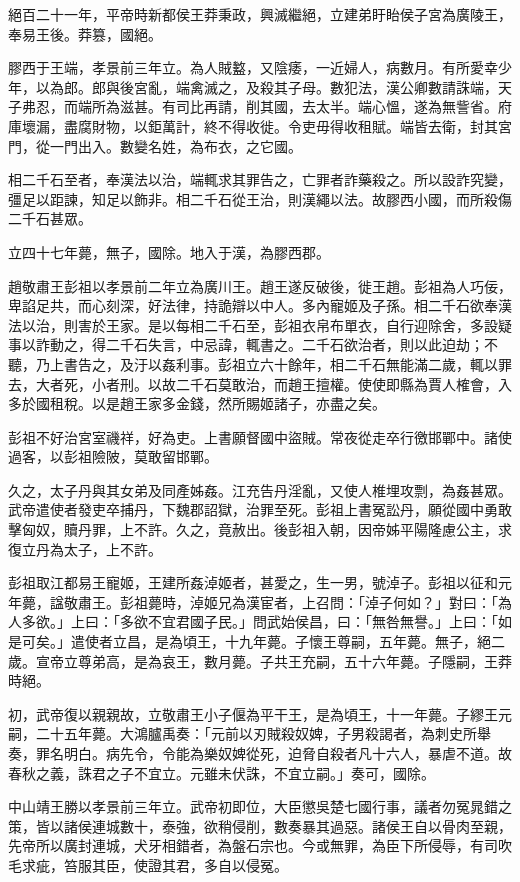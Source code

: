 \begin{pinyinscope}
絕百二十一年，平帝時新都侯王莽秉政，興滅繼絕，立建弟盱眙侯子宮為廣陵王，奉易王後。莽篡，國絕。

膠西于王端，孝景前三年立。為人賊盭，又陰痿，一近婦人，病數月。有所愛幸少年，以為郎。郎與後宮亂，端禽滅之，及殺其子母。數犯法，漢公卿數請誅端，天子弗忍，而端所為滋甚。有司比再請，削其國，去太半。端心慍，遂為無訾省。府庫壞漏，盡腐財物，以鉅萬計，終不得收徙。令吏毋得收租賦。端皆去衛，封其宮門，從一門出入。數變名姓，為布衣，之它國。

相二千石至者，奉漢法以治，端輒求其罪告之，亡罪者詐藥殺之。所以設詐究變，彊足以距諫，知足以飾非。相二千石從王治，則漢繩以法。故膠西小國，而所殺傷二千石甚眾。

立四十七年薨，無子，國除。地入于漢，為膠西郡。

趙敬肅王彭祖以孝景前二年立為廣川王。趙王遂反破後，徙王趙。彭祖為人巧佞，卑諂足共，而心刻深，好法律，持詭辯以中人。多內寵姬及子孫。相二千石欲奉漢法以治，則害於王家。是以每相二千石至，彭祖衣帛布單衣，自行迎除舍，多設疑事以詐動之，得二千石失言，中忌諱，輒書之。二千石欲治者，則以此迫劫；不聽，乃上書告之，及汙以姦利事。彭祖立六十餘年，相二千石無能滿二歲，輒以罪去，大者死，小者刑。以故二千石莫敢治，而趙王擅權。使使即縣為賈人榷會，入多於國租稅。以是趙王家多金錢，然所賜姬諸子，亦盡之矣。

彭祖不好治宮室禨祥，好為吏。上書願督國中盜賊。常夜從走卒行徼邯鄲中。諸使過客，以彭祖險陂，莫敢留邯鄲。

久之，太子丹與其女弟及同產姊姦。江充告丹淫亂，又使人椎埋攻剽，為姦甚眾。武帝遣使者發吏卒捕丹，下魏郡詔獄，治罪至死。彭祖上書冤訟丹，願從國中勇敢擊匈奴，贖丹罪，上不許。久之，竟赦出。後彭祖入朝，因帝姊平陽隆慮公主，求復立丹為太子，上不許。

彭祖取江都易王寵姬，王建所姦淖姬者，甚愛之，生一男，號淖子。彭祖以征和元年薨，諡敬肅王。彭祖薨時，淖姬兄為漢宦者，上召問：「淖子何如？」對曰：「為人多欲。」上曰：「多欲不宜君國子民。」問武始侯昌，曰：「無咎無譽。」上曰：「如是可矣。」遣使者立昌，是為頃王，十九年薨。子懷王尊嗣，五年薨。無子，絕二歲。宣帝立尊弟高，是為哀王，數月薨。子共王充嗣，五十六年薨。子隱嗣，王莽時絕。

初，武帝復以親親故，立敬肅王小子偃為平干王，是為頃王，十一年薨。子繆王元嗣，二十五年薨。大鴻臚禹奏：「元前以刃賊殺奴婢，子男殺謁者，為刺史所舉奏，罪名明白。病先令，令能為樂奴婢從死，迫脅自殺者凡十六人，暴虐不道。故春秋之義，誅君之子不宜立。元雖未伏誅，不宜立嗣。」奏可，國除。

中山靖王勝以孝景前三年立。武帝初即位，大臣懲吳楚七國行事，議者勿冤晁錯之策，皆以諸侯連城數十，泰強，欲稍侵削，數奏暴其過惡。諸侯王自以骨肉至親，先帝所以廣封連城，犬牙相錯者，為盤石宗也。今或無罪，為臣下所侵辱，有司吹毛求疵，笞服其臣，使證其君，多自以侵冤。


\end{pinyinscope}
